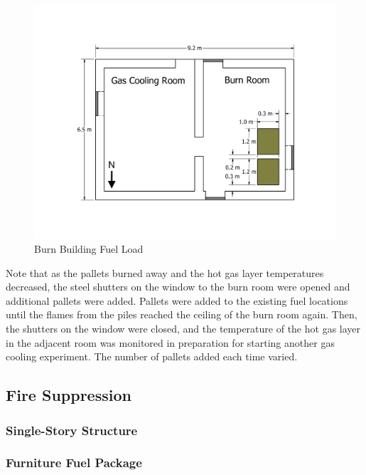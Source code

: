 \documentclass[12pt,oneside]{book}
\begin{document}
\begin{figure}[!ht]
	\includegraphics[width=\columnwidth]{../Figures/Floor_Plans/PDFs/West_Structure/DelCo_2012_West_Structure_Pallets}
	\caption{Burn Building Fuel Load}
	\label{fig:Burn_Building_Fuel_Load}
\end{figure}

Note that as the pallets burned away and the hot gas layer temperatures decreased, the steel shutters on the window to the burn room were opened and additional pallets were added. Pallets were added to the existing fuel locations until the flames from the piles reached the ceiling of the burn room again. Then, the shutters on the window were closed, and the temperature of the hot gas layer in the adjacent room was monitored in preparation for starting another gas cooling experiment.  The number of pallets added each time varied.

\clearpage

\subsection{Fire Suppression}
\label{sec:Fuel_Load_Fire_Suppression}

\subsubsection*{Single-Story Structure}
\label{sec:suppresion_single}

\subsubsection{Furniture Fuel Package}
\label{sec:fire_suppression_furniture_fuel}
\end{document}
